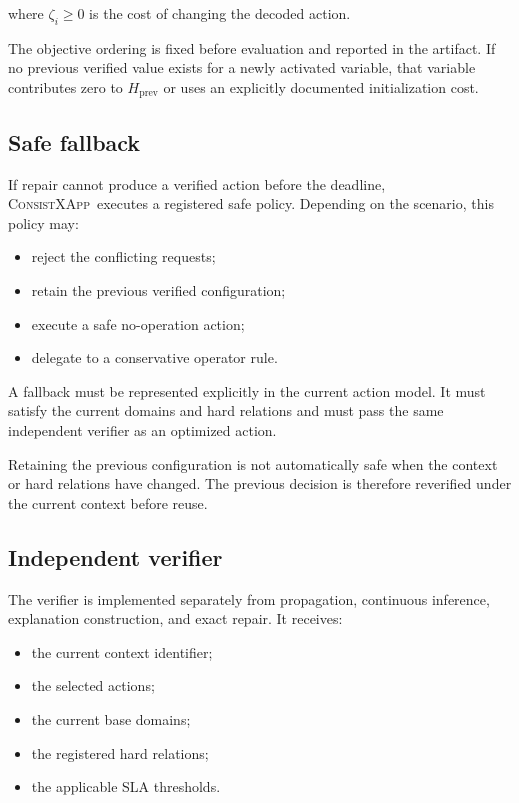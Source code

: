 \documentclass[pdflatex,sn-mathphys-num,iicol,oneside]{sn-jnl}
\newcommand{\method}{\textsc{ConsistXApp}}
\begin{document}
where $\zeta_i\geq 0$ is the cost of changing the decoded action.

The objective ordering is fixed before evaluation and reported in the
artifact. If no previous verified value exists for a newly activated
variable, that variable contributes zero to
$H_{\mathrm{prev}}$ or uses an explicitly documented initialization
cost.

\subsection{Safe fallback}

If repair cannot produce a verified action before the deadline,
\method\ executes a registered safe policy. Depending on the
scenario, this policy may:

\begin{itemize}
    \item reject the conflicting requests;
    \item retain the previous verified configuration;
    \item execute a safe no-operation action;
    \item delegate to a conservative operator rule.
\end{itemize}

A fallback must be represented explicitly in the current action model.
It must satisfy the current domains and hard relations and must pass
the same independent verifier as an optimized action.

Retaining the previous configuration is not automatically safe when
the context or hard relations have changed. The previous decision is
therefore reverified under the current context before reuse.

\subsection{Independent verifier}

The verifier is implemented separately from propagation, continuous
inference, explanation construction, and exact repair. It receives:

\begin{itemize}
    \item the current context identifier;
    \item the selected actions;
    \item the current base domains;
    \item the registered hard relations;
    \item the applicable SLA thresholds.
\end{itemize}
\end{document}
